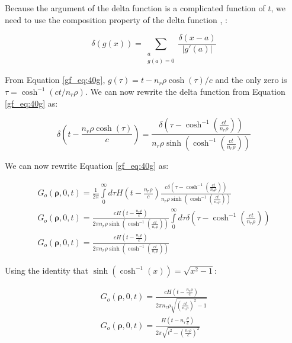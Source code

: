 Because the argument of the delta function is a complicated function of $t$, we need to use the composition property of the delta function \cite{arfken_weber}, \cite{gbur_math}:

 \begin{equation}
\delta\left(g(x) \right) = \sum_{\substack{a \\g(a)=0}}\frac{\delta(x-a)}{|g'(a)|}
\label{gf_eq:40h}
\end{equation}
 \renewcommand{\baselinestretch}{2} \small\normalsize
 
From Equation \ref{gf_eq:40g}, $g(\tau) = t - n_r\rho\cosh(\tau)/c$ and the only zero  is $\tau = \cosh^{-1}\left(ct/n_r\rho\right)$. We can now rewrite the delta function from Equation \ref{gf_eq:40g} as:

 \begin{equation}
\delta\left(t - \frac{n_r\rho \cosh(\tau)}{c}\right) = \frac{\delta\left(\tau -\cosh^{-1}\left(\frac{ct}{n_r\rho} \right) \right)}{n_r\rho\sinh\left(\cosh^{-1}\left(\frac{ct}{n_r\rho} \right) \right)}
\label{gf_eq:40i}
\end{equation}
 \renewcommand{\baselinestretch}{2} \small\normalsize
 
\noindent We can now rewrite Equation \ref{gf_eq:40g} as:

 \begin{equation}
 \begin{gathered}
G_o\left(\boldsymbol{\rho},0,t\right) = \frac{1}{2\pi}\int\limits_{0}^{\infty}d\tau H\left(t -\frac{n_r\rho}{c}\right)  \frac{c\delta\left(\tau -\cosh^{-1}\left(\frac{ct}{n_r\rho} \right) \right)}{n_r\rho\sinh\left(\cosh^{-1}\left(\frac{ct}{n_r\rho} \right) \right)}\\
G_o\left(\boldsymbol{\rho},0,t\right) = \frac{cH\left(t -\frac{n_r\rho}{c}\right)}{2\pi n_r\rho\sinh\left(\cosh^{-1}\left(\frac{ct}{n_r\rho} \right) \right)}\int\limits_{0}^{\infty}d\tau \delta\left(\tau -\cosh^{-1}\left(\frac{ct}{n_r\rho} \right) \right)\\
G_o\left(\boldsymbol{\rho},0,t\right) = \frac{cH\left(t -\frac{n_r\rho}{c}\right)}{2\pi n_r\rho\sinh\left(\cosh^{-1}\left(\frac{ct}{n_r\rho} \right) \right)}
\end{gathered}
\label{gf_eq:40j}
\end{equation}
 \renewcommand{\baselinestretch}{2} \small\normalsize
 
\noindent Using the identity that $\sinh\left(\cosh^{-1}(x) \right) = \sqrt{x^2 -1}$:

 \begin{equation}
 \begin{gathered}
G_o\left(\boldsymbol{\rho},0,t\right) = \frac{cH\left(t -\frac{n_r\rho}{c}\right)}{2\pi n_r\rho\sqrt{\left(\frac{ct}{n_r\rho} \right)^2 - 1}     }\\
G_o\left(\boldsymbol{\rho},0,t\right) = \frac{H\left(t -n_r\frac{\rho}{c}\right)}{2\pi \sqrt{t^2 - \left(\frac{n_r\rho}{c}\right)^2}     }
\end{gathered}
\label{gf_eq:40k}
\end{equation}
 \renewcommand{\baselinestretch}{2} \small\normalsize
 
